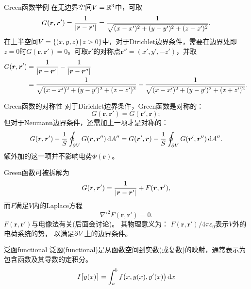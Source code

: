 \begin{example}{Green函数举例}{}
    在无边界空间$V = \mathbb{R}^3$中，可取
    \begin{equation}
        \label{eq:ed-poisson-free-green}
        G(\bm r,\bm r') = \frac1{\lvert\bm r - \bm r'\rvert} = \frac1{\sqrt{(x - x')^2 + (y - y')^2 + (z - z')^2}}.
    \end{equation}
    在上半空间$V = \{(x,y,z)\,\vert\,z > 0\}$中，对于Dirichlet边界条件，需要在边界处即$z = 0$时$G(\bm r,\bm r') = 0$。可取$\bm r'$的对称点$\bm r'' = (x',y',-z')$，并取
    \begin{equation}
        \label{eq:ed-planar-dirichlet-green}
        \begin{aligned}
            G(\bm r,\bm r') &= \frac1{\lvert\bm r - \bm r'\rvert} - \frac1{\lvert\bm r - \bm r''\rvert}\\
            &= \frac1{\sqrt{(x - x')^2 + (y - y')^2 + (z - z')^2}} - \frac1{\sqrt{(x - x')^2 + (y - y')^2 + (z + z')^2}}.
        \end{aligned}
    \end{equation}
\end{example}
\begin{theorem}
    {Green函数的对称性}{}
    对于Dirichlet边界条件，Green函数是对称的：
    \begin{equation}
        \label{eq:ed-dirichlet-green-symmetry}
        G(\bm r,\bm r') = G(\bm r',\bm r);
    \end{equation}
    但对于Neumann边界条件，还需加上一项才是对称的：
    \begin{equation}
        \label{eq:ed-neumann-green-symmetry}
        G(\bm r,\bm r') - \frac1S\oint_{\partial V}G(\bm r,\bm r'')\mathop{}\!\mathrm{d} A'' = G(\bm r',\bm r) - \frac1S\oint_{\partial V}G(\bm r',\bm r'')\mathop{}\!\mathrm{d} A''.
    \end{equation}
    额外加的这一项并不影响电势$\Phi(\bm r)$。
\end{theorem}
Green函数可被拆解为
\begin{equation}
    \label{eq:ed-green-regular-part}
    G(\bm r,\bm r') = \frac1{\lvert\bm r - \bm r'\rvert} + F(\bm r,\bm r'),
\end{equation}
而$F$满足$V$内的Laplace方程
\[
    \nabla'^2F(\bm r,\bm r') = 0.
\]
$F(\bm r, \bm r')$与电像法有关(后面会讨论)。
其物理意义为：
$F(\bm r, \bm r')/4\pi\varepsilon_0$表示$V$外的电荷系统的势，
以满足$\partial V$上的边界条件。


\begin{definition}
    {泛函}{functional}
    泛函(functional)是从函数空间到实数(或复数)的映射，通常表示为包含函数及其导数的定积分。
    \begin{equation}
        I\bigl[y(x)\bigr] = \int_a^bf\bigl(x,y(x),y'(x)\bigr)\mathop{}\!\mathrm{d} x
    \end{equation}
\end{definition}

